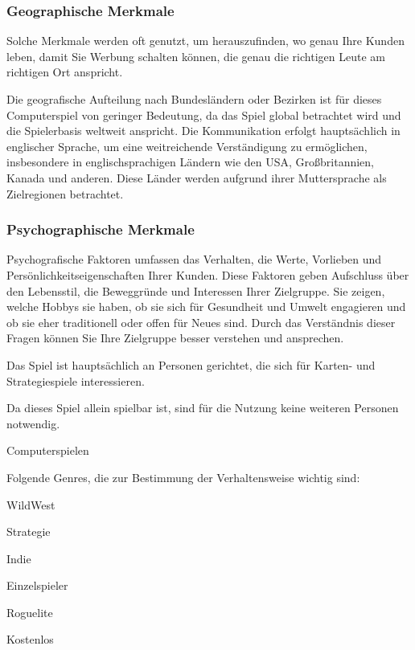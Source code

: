 \subsubsection{Geographische Merkmale}\label{subsubsec:Geographische-Merkmale}
Solche Merkmale werden oft genutzt, um herauszufinden, wo genau Ihre Kunden leben, damit Sie Werbung schalten können, die genau die richtigen Leute am richtigen Ort anspricht.

Die geografische Aufteilung nach Bundesländern oder Bezirken ist für dieses Computerspiel von geringer Bedeutung, da das Spiel global betrachtet wird und die Spielerbasis weltweit anspricht.
Die Kommunikation erfolgt hauptsächlich in englischer Sprache, um eine weitreichende Verständigung zu ermöglichen, insbesondere in englischsprachigen Ländern wie den USA, Großbritannien, Kanada und anderen.
Diese Länder werden aufgrund ihrer Muttersprache als Zielregionen betrachtet.

\subsubsection{Psychographische Merkmale}\label{subsubsec:Psychographische-Merkmale}

Psychografische Faktoren umfassen das Verhalten, die Werte, Vorlieben und Persönlichkeitseigenschaften Ihrer Kunden.
Diese Faktoren geben Aufschluss über den Lebensstil, die Beweggründe und Interessen Ihrer Zielgruppe.
Sie zeigen, welche Hobbys sie haben, ob sie sich für Gesundheit und Umwelt engagieren und ob sie eher traditionell oder offen für Neues sind.
Durch das Verständnis dieser Fragen können Sie Ihre Zielgruppe besser verstehen und ansprechen.

 Das Spiel ist hauptsächlich an Personen gerichtet, die sich für Karten- und Strategiespiele interessieren.

 Da dieses Spiel allein spielbar ist, sind für die Nutzung keine weiteren Personen notwendig.

 Computerspielen

Folgende Genres, die zur Bestimmung der Verhaltensweise wichtig sind:
\begin{liste}
    \item WildWest
    \item Strategie
    \item Indie
    \item Einzelspieler
    \item Roguelite
    \item Kostenlos
\end{liste}


